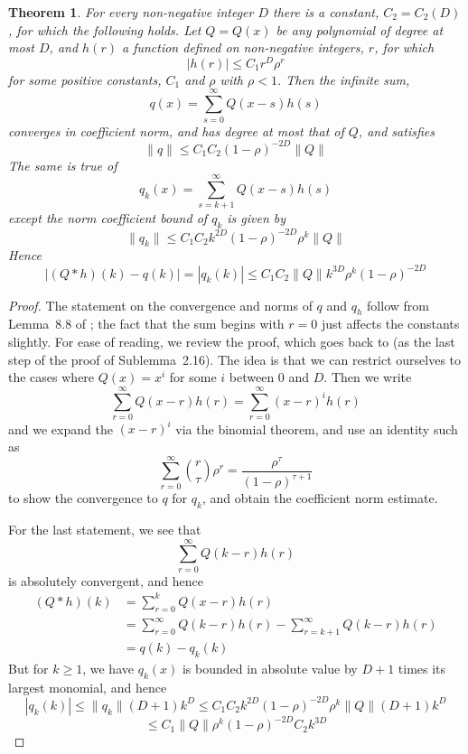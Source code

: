 \documentclass{memo-l}
\theoremstyle{plain}
\theoremstyle{definition}
\numberwithin{section}{chapter}
\numberwithin{equation}{chapter}
\theoremstyle{plain}
\newtheorem{thm}[theorem]{Theorem}
\theoremstyle{definition}
\begin{document}
\begin{thm}\label{th:conv_polyexp_growth} For every non-negative integer \(
D \) there is a constant, \( C_2=C_2(D) \), for which the following holds.
Let \( Q=Q(x) \) be any polynomial of degree at most \( D \), and \( h(r)
\) a function defined on non-negative integers, \( r \), for which \[
|h(r)| \leq  C_1 r^D \rho^r \] for some positive constants, \(C_1 \) and \(
\rho \) with \( \rho<1 \). Then the infinite sum, \[ q(x) =
\sum_{s=0}^\infty Q(x-s)h(s) \] converges in coefficient norm, and has
degree at most that of \( Q \), and satisfies \[ \| q \| \leq C_1 C_2
(1-\rho)^{-2D} \| Q \| \] The same is true of \[ q_k(x) =
\sum_{s=k+1}^\infty Q(x-s)h(s) \] except the norm coefficient bound of \(
q_k \) is given by \[ \| q_k \| \leq C_1 C_2 k^{2D} (1-\rho)^{-2D} \rho^k
\| Q\| \] Hence \[ | (Q * h)(k) - q(k) |  = | q_k(k) | \leq C_1C_2 \|Q\|
k^{3D} \rho^k (1-\rho)^{-2D} \] \end{thm} \begin{proof} The statement on
the convergence and norms of \( q \) and \( q_h \) follow from Lemma~8.8 of
\cite{friedman_alon}; the fact that the sum begins with \( r=0 \) just
affects the constants slightly. For ease of reading, we review the proof,
which goes back to \cite{friedman_random_graphs} (as the last step of the
proof of Sublemma~2.16).  The idea is that we can restrict ourselves to the
cases where \( Q(x)=x^i \) for some \( i \) between \( 0 \) and \( D \).
Then we write \begin{equation}\label{eq:convolve_h} \sum_{r=0}^\infty
Q(x-r) h(r) = \sum_{r=0}^\infty  (x-r)^i h(r) \end{equation} and we expand
the \( (x-r)^i \) via the binomial theorem, and use an identity such as \[
\sum_{r=0}^\infty \binom{r}{\tau} \rho^r =
\frac{\rho^\tau}{(1-\rho)^{\tau+1}} \] to show the convergence to \( q \)
for \( q_k \), and obtain the coefficient norm estimate.

For the last statement, we see that \[ \sum_{r=0}^\infty Q(k-r) h(r) \] is
absolutely convergent, and hence \begin{align*} (Q * h )(k) &= \sum_{r=0}^k
Q(x-r) h(r) \\ &= \sum_{r=0}^\infty Q(k-r) h(r) - \sum_{r=k+1}^\infty
Q(k-r) h(r) \\ &= q(k) - q_k(k) \end{align*} But for \( k\geq 1 \), we have
\( q_k(x) \) is bounded in absolute value by \( D+1 \) times its largest
monomial, and hence \[ |q_k(k) | \leq \|q_k\| (D+1) k^D \leq C_1 C_2 k^{2D}
(1-\rho)^{-2D} \rho^k \| Q\| (D+1)k^D \] \[ \leq C_1 \|Q\| \rho^k
(1-\rho)^{-2D} C_2 k^{3D} \] \end{proof}
\end{document}

